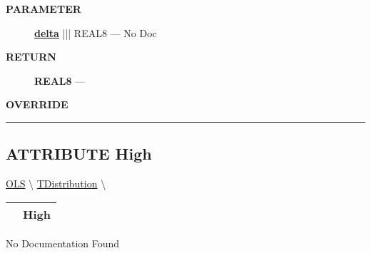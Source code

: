\par
\begin{description}
\item [\colorbox{tagtype}{\color{white} \textbf{\textsf{PARAMETER}}}] \textbf{\underline{delta}} ||| REAL8 --- No Doc
\end{description}







\par
\begin{description}
\item [\colorbox{tagtype}{\color{white} \textbf{\textsf{RETURN}}}] \textbf{REAL8} --- 
\end{description}






\par
\begin{description}
\item [\colorbox{tagtype}{\color{white} \textbf{\textsf{OVERRIDE}}}] 
\end{description}



\rule{\linewidth}{0.5pt}
\subsection*{\textsf{\colorbox{headtoc}{\color{white} ATTRIBUTE}
High}}

\hypertarget{ecldoc:linearregression.ols.tdistribution.high}{}
\hspace{0pt} \hyperlink{ecldoc:linearregression.ols}{OLS} \textbackslash 
\hspace{0pt} \hyperlink{ecldoc:linearregression.ols.tdistribution}{TDistribution} \textbackslash 

{\renewcommand{\arraystretch}{1.5}
\begin{tabularx}{\textwidth}{|>{\raggedright\arraybackslash}l|X|}
\hline
\hspace{0pt}\mytexttt{\color{red} } & \textbf{High} \\
\hline
\end{tabularx}
}

\par





No Documentation Found








